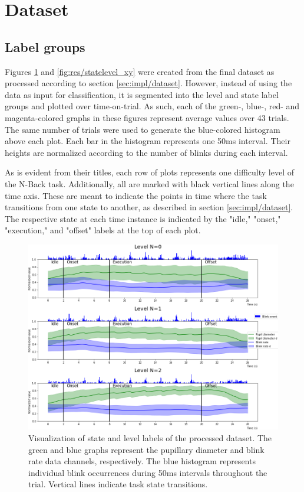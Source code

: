 \section{Dataset} \label{sec:res_dataset}

\subsection{Label groups}

Figures \ref{fig:res/statelevel_pbr} and \ref{fig:res/statelevel_xy} were created from the final dataset as processed according to section \ref{sec:impl/dataset}. However, instead of using the data as input for classification, it is segmented into the level and state label groups and plotted over time-on-trial. As such, each of the green-, blue-, red- and magenta-colored graphs in these figures represent average values over 43 trials. The same number of trials were used to generate the blue-colored histogram above each plot. Each bar in the histogram represents one 50ms interval. Their heights are normalized according to the number of blinks during each interval.

As is evident from their titles, each row of plots represents one difficulty level of the N-Back task. Additionally, all are marked with black vertical lines along the time axis. These are meant to indicate the points in time where the task transitions from one state to another, as described in section \ref{sec:impl/dataset}. The respective state at each time instance is indicated by the "idle," "onset," "execution," and "offset" labels at the top of each plot.

\begin{figure}[h]
    \centering
    \includegraphics[width=\textwidth]{figures/impl_statelevelvisualization_pbr.png}
    \caption{Visualization of state and level labels of the processed dataset. The green and blue graphs represent the pupillary diameter and blink rate data channels, respectively. The blue histogram represents individual blink occurrences during 50ms intervals throughout the trial. Vertical lines indicate task state transitions.}
    \label{fig:res/statelevel_pbr}
\end{figure}


